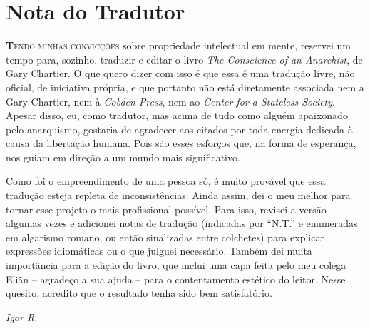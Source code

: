 
\chapter{Nota do Tradutor}

\lettrine[lines=2]{\textcolor{LettrineColor}{\textbf{T}}}{endo minhas convicções} sobre propriedade intelectual em mente, reservei um tempo para, sozinho, traduzir e editar o livro \emph{The Conscience of an Anarchist}, de Gary Chartier. O que quero dizer com isso é que essa é uma tradução livre, não oficial, de iniciativa própria, e que portanto não está diretamente associada nem a Gary Chartier, nem à \emph{Cobden Press}, nem ao \emph{Center for a Stateless Society}. Apesar disso, eu, como tradutor, mas acima de tudo como alguém apaixonado pelo anarquismo, gostaria de agradecer aos citados por toda energia dedicada à causa da libertação humana. Pois são esses esforços que, na forma de esperança, nos guiam em direção a um mundo mais significativo.

Como foi o empreendimento de uma pessoa só, é muito provável que essa tradução esteja repleta de inconsistências. Ainda assim, dei o meu melhor para tornar esse projeto o mais profissional possível. Para isso, revisei a versão algumas vezes e adicionei notas de tradução (indicadas por ``N.T.'' e enumeradas em algarismo romano, ou então sinalizadas entre colchetes) para explicar expressões idiomáticas ou o que julguei necessário. Também dei muita importância para a edição do livro, que inclui uma capa feita pelo meu colega Eliãn -- agradeço a sua ajuda -- para o contentamento estético do leitor. Nesse quesito, acredito que o resultado tenha sido bem satisfatório.

\begin{flushright}
\large\emph{Igor R.}
\end{flushright}
